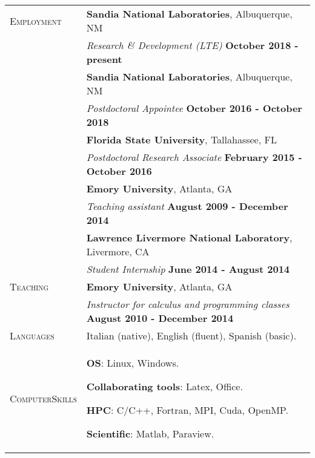 \documentclass[10pt]{article}
\begin{document}
\begin{tabular}{p{2.5cm}|p{15.5cm}}
\\
\textsc{Employment} &

\textbf{Sandia National Laboratories}, Albuquerque, NM\\
& \textit{Research \& Development (LTE)} \hspace*{6.5cm} \textbf{October 2018 - present}

\\
&\textbf{Sandia National Laboratories}, Albuquerque, NM\\
& \textit{Postdoctoral Appointee} \hspace*{6.7cm} \textbf{October 2016 - October 2018}

\\
&\textbf{Florida State University}, Tallahassee, FL\\
& \textit{Postdoctoral Research Associate} \hspace*{5.1cm} \textbf{February 2015 - October 2016}

\\
&\textbf{Emory University}, Atlanta, GA\\
& \textit{Teaching assistant} \hspace*{7.2cm} \textbf{August 2009 - December 2014}

\\
&\textbf{Lawrence Livermore National Laboratory}, Livermore, CA\\
& \textit{Student Internship} \hspace*{8cm} \textbf{June 2014 - August 2014}

\\
\textsc{Teaching}
 & \textbf{Emory University}, Atlanta, GA\\
 & \textit{Instructor for calculus and programming classes} \hspace*{2.5cm} \textbf{August 2010 - December 2014}

\\
\textsc{Languages} & Italian (native), English (fluent), Spanish (basic).

\\
\textsc{Computer\linebreak Skills} &

\textbf{OS}: Linux, Windows.

\textbf{Collaborating tools}: Latex, Office.

\textbf{HPC}: C/C++, Fortran, MPI, Cuda, OpenMP.

\textbf{Scientific}: Matlab, Paraview.

\end{tabular}
\end{document}

